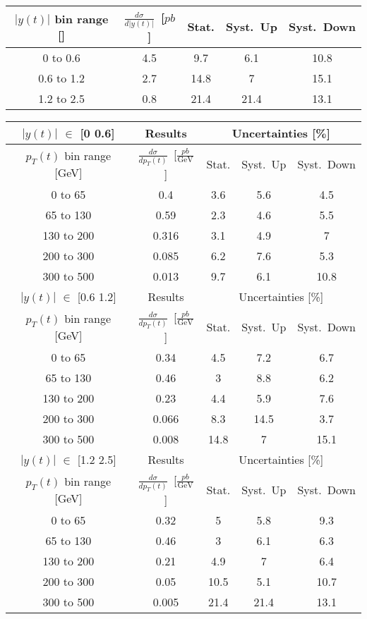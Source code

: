 \begin{table}[h]
\begin{tabular}{|c|c|c|c|c|}
\hline
$|y(t)|$ bin range []&$\frac{d\sigma}{d|y(t)|}$~[$pb$]&Stat.&Syst.~Up&Syst.~Down \\ 
\hline
0 to 0.6&4.5&9.7&6.1&10.8 \\ 
0.6 to 1.2&2.7&14.8&7&15.1 \\ 
1.2 to 2.5&0.8&21.4&21.4&13.1 \\ 
\hline
\end{tabular}
\end{table}

\begin{table}[h]
\begin{tabular}{|c|c|c|c|c|}
\hline
$|y(t)|$ $\in$ [0 0.6]  & Results &\multicolumn{3}{c|}{Uncertainties [\%] }  \\ 
\hline
$p_{T}(t)$ bin range [GeV]&$\frac{d\sigma}{dp_{T}(t)}$~[$\frac{pb}{\text{GeV}}$]&Stat.&Syst.~Up&Syst.~Down \\ 
\hline
0 to 65&0.4&3.6&5.6&4.5 \\ 
65 to 130&0.59&2.3&4.6&5.5 \\ 
130 to 200&0.316&3.1&4.9&7 \\ 
200 to 300&0.085&6.2&7.6&5.3 \\ 
300 to 500&0.013&9.7&6.1&10.8 \\ 
\hline
\hline
$|y(t)|$ $\in$ [0.6 1.2]  & Results &\multicolumn{3}{c|}{Uncertainties [\%] }  \\ 
\hline
$p_{T}(t)$ bin range [GeV]&$\frac{d\sigma}{dp_{T}(t)}$~[$\frac{pb}{\text{GeV}}$]&Stat.&Syst.~Up&Syst.~Down \\ 
\hline
0 to 65&0.34&4.5&7.2&6.7 \\ 
65 to 130&0.46&3&8.8&6.2 \\ 
130 to 200&0.23&4.4&5.9&7.6 \\ 
200 to 300&0.066&8.3&14.5&3.7 \\ 
300 to 500&0.008&14.8&7&15.1 \\ 
\hline
\hline
$|y(t)|$ $\in$ [1.2 2.5]  & Results &\multicolumn{3}{c|}{Uncertainties [\%] }  \\ 
\hline
$p_{T}(t)$ bin range [GeV]&$\frac{d\sigma}{dp_{T}(t)}$~[$\frac{pb}{\text{GeV}}$]&Stat.&Syst.~Up&Syst.~Down \\ 
\hline
0 to 65&0.32&5&5.8&9.3 \\ 
65 to 130&0.46&3&6.1&6.3 \\ 
130 to 200&0.21&4.9&7&6.4 \\ 
200 to 300&0.05&10.5&5.1&10.7 \\ 
300 to 500&0.005&21.4&21.4&13.1 \\ 
\hline
\end{tabular}
\end{table}
